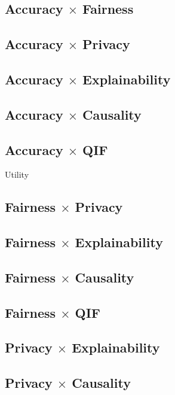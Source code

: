 \subsection{Accuracy $\times$ Fairness}

\subsection{Accuracy $\times$ Privacy}

\subsection{Accuracy $\times$ Explainability}

\subsection{Accuracy $\times$ Causality}

\subsection{Accuracy $\times$ QIF}

Utility

\subsection{Fairness $\times$ Privacy}

\subsection{Fairness $\times$ Explainability}


\subsection{Fairness $\times$ Causality}

\subsection{Fairness $\times$ QIF}

\subsection{Privacy $\times$ Explainability}

\subsection{Privacy $\times$ Causality}

